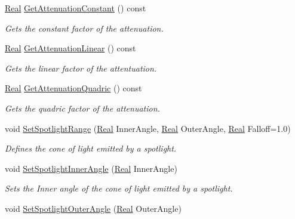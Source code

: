 \begin{DoxyCompactItemize}
\hyperlink{namespacephys_af7eb897198d265b8e868f45240230d5f}{Real} \hyperlink{classphys_1_1Light_aad30f7fb932b030de7eb15046dea83a7}{GetAttenuationConstant} () const 
\begin{DoxyCompactList}\small\item\em Gets the constant factor of the attenuation. \item\end{DoxyCompactList}\item 
\hyperlink{namespacephys_af7eb897198d265b8e868f45240230d5f}{Real} \hyperlink{classphys_1_1Light_a92245ddc5383fd7f0989866852e36ed8}{GetAttenuationLinear} () const 
\begin{DoxyCompactList}\small\item\em Gets the linear factor of the attentuation. \item\end{DoxyCompactList}\item 
\hyperlink{namespacephys_af7eb897198d265b8e868f45240230d5f}{Real} \hyperlink{classphys_1_1Light_a4ea9693e7ba3f4b6199f132b29e645fa}{GetAttenuationQuadric} () const 
\begin{DoxyCompactList}\small\item\em Gets the quadric factor of the attenuation. \item\end{DoxyCompactList}\item 
void \hyperlink{classphys_1_1Light_a25c79247a42b49d04825bbc76977a134}{SetSpotlightRange} (\hyperlink{namespacephys_af7eb897198d265b8e868f45240230d5f}{Real} InnerAngle, \hyperlink{namespacephys_af7eb897198d265b8e868f45240230d5f}{Real} OuterAngle, \hyperlink{namespacephys_af7eb897198d265b8e868f45240230d5f}{Real} Falloff=1.0)
\begin{DoxyCompactList}\small\item\em Defines the cone of light emitted by a spotlight. \item\end{DoxyCompactList}\item 
void \hyperlink{classphys_1_1Light_a3b812a0181d08f3c30c9a75f13fd6282}{SetSpotlightInnerAngle} (\hyperlink{namespacephys_af7eb897198d265b8e868f45240230d5f}{Real} InnerAngle)
\begin{DoxyCompactList}\small\item\em Sets the Inner angle of the cone of light emitted by a spotlight. \item\end{DoxyCompactList}\item 
void \hyperlink{classphys_1_1Light_a6cab679dfc15d35e3d3b8b229e602fff}{SetSpotlightOuterAngle} (\hyperlink{namespacephys_af7eb897198d265b8e868f45240230d5f}{Real} OuterAngle)

\end{DoxyCompactItemize}
